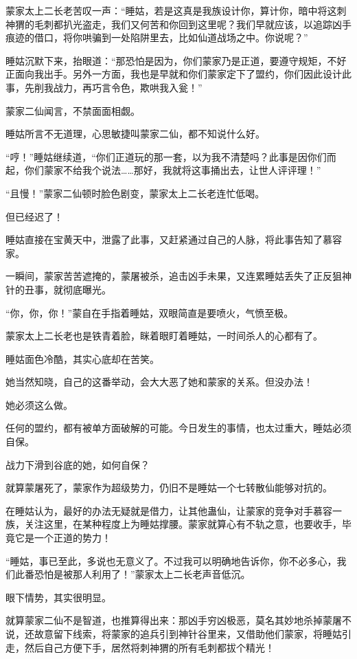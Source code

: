 \begin{this_body}
蒙家太上二长老苦叹一声：“睡姑，若是这真是我族设计你，算计你，暗中将这刺神猬的毛刺都扒光盗走，我们又何苦和你回到这里呢？我们早就应该，以追踪凶手痕迹的借口，将你哄骗到一处陷阱里去，比如仙道战场之中。你说呢？”

睡姑沉默下来，抬眼道：“那恐怕是因为，你们蒙家乃是正道，要遵守规矩，不好正面向我出手。另外一方面，我也是早就和你们蒙家定下了盟约，你们因此设计此事，先削我战力，再巧言令色，欺哄我入瓮！”

蒙家二仙闻言，不禁面面相觑。

睡姑所言不无道理，心思敏捷叫蒙家二仙，都不知说什么好。

“哼！”睡姑继续道，“你们正道玩的那一套，以为我不清楚吗？此事是因你们而起，你们蒙家不给我个说法……那好，我就将这事捅出去，让世人评评理！”

“且慢！”蒙家二仙顿时脸色剧变，蒙家太上二长老连忙低喝。

但已经迟了！

睡姑直接在宝黄天中，泄露了此事，又赶紧通过自己的人脉，将此事告知了慕容家。

一瞬间，蒙家苦苦遮掩的，蒙屠被杀，追击凶手未果，又连累睡姑丢失了正反狙神针的丑事，就彻底曝光。

“你，你，你！”蒙自在手指着睡姑，双眼简直是要喷火，气愤至极。

蒙家太上二长老也是铁青着脸，眯着眼盯着睡姑，一时间杀人的心都有了。

睡姑面色冷酷，其实心底却在苦笑。

她当然知晓，自己的这番举动，会大大恶了她和蒙家的关系。但没办法！

她必须这么做。

任何的盟约，都有被单方面破解的可能。今日发生的事情，也太过重大，睡姑必须自保。

战力下滑到谷底的她，如何自保？

就算蒙屠死了，蒙家作为超级势力，仍旧不是睡姑一个七转散仙能够对抗的。

在睡姑认为，最好的办法无疑就是借力，让其他蛊仙，让蒙家的竞争对手慕容一族，关注这里，在某种程度上为睡姑撑腰。蒙家就算心有不轨之意，也要收手，毕竟它是一个正道的势力！

“睡姑，事已至此，多说也无意义了。不过我可以明确地告诉你，你不必多心，我们此番恐怕是被那人利用了！”蒙家太上二长老声音低沉。

眼下情势，其实很明显。

就算蒙家二仙不是智道，也推算得出来：那凶手穷凶极恶，莫名其妙地杀掉蒙屠不说，还故意留下线索，将蒙家的追兵引到神针谷里来，又借助他们蒙家，将睡姑引走，然后自己方便下手，居然将刺神猬的所有毛刺都拔个精光！


\end{this_body}
